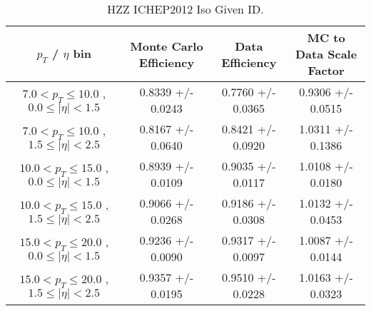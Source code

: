  \begin{table}[!ht]
 \begin{center} 
 \begin{tabular}{|c|c|c|c|}
 \hline
 $p_{T}$ / $\eta$ bin    &  Monte Carlo Efficiency    &  Data Efficiency   &  MC to Data Scale Factor \\   \hline           
$  7.0 < p_{T} \le  10.0$ , $  0.0  \le |\eta| <   1.5$   &       0.8339 +/- 0.0243   &       0.7760 +/- 0.0365   &       0.9306 +/- 0.0515   \\   
\hline
$  7.0 < p_{T} \le  10.0$ , $  1.5  \le |\eta| <   2.5$   &       0.8167 +/- 0.0640   &       0.8421 +/- 0.0920   &       1.0311 +/- 0.1386   \\   
\hline
$ 10.0 < p_{T} \le  15.0$ , $  0.0  \le |\eta| <   1.5$   &       0.8939 +/- 0.0109   &       0.9035 +/- 0.0117   &       1.0108 +/- 0.0180   \\   
\hline
$ 10.0 < p_{T} \le  15.0$ , $  1.5  \le |\eta| <   2.5$   &       0.9066 +/- 0.0268   &       0.9186 +/- 0.0308   &       1.0132 +/- 0.0453   \\   
\hline
$ 15.0 < p_{T} \le  20.0$ , $  0.0  \le |\eta| <   1.5$   &       0.9236 +/- 0.0090   &       0.9317 +/- 0.0097   &       1.0087 +/- 0.0144   \\   
\hline
$ 15.0 < p_{T} \le  20.0$ , $  1.5  \le |\eta| <   2.5$   &       0.9357 +/- 0.0195   &       0.9510 +/- 0.0228   &       1.0163 +/- 0.0323   \\   
\hline
\end{tabular}
\caption{HZZ ICHEP2012 Iso Given ID.}
\label{tab:eff_ele_offline}
\end{center}
\end{table}

